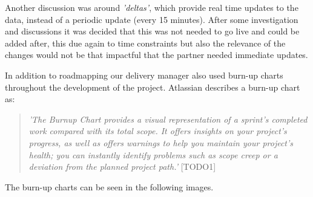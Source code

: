   Another discussion was around \textit{'deltas'}, which provide real time updates to the data, instead of a periodic update (every
  15 minutes). After some investigation and discussions it was decided that this was not needed to go live and could be added after, this due again 
  to time constraints but also the relevance of the changes would not be that impactful that the partner needed immediate updates.

  \vspace{0.2cm}

  In addition to roadmapping our delivery manager also used burn-up charts throughout the development of the project. Atlassian describes a
  burn-up chart as:

  \begin{quote}
    \textit{'The Burnup Chart provides a visual representation of a sprint's completed work compared with its total scope. It offers insights 
    on your project's progress, as well as offers warnings to help you maintain your project's health; you can instantly identify problems such 
    as scope creep or a deviation from the planned project path.'} [TODO1]
  \end{quote}

  The burn-up charts can be seen in the following images.
  
